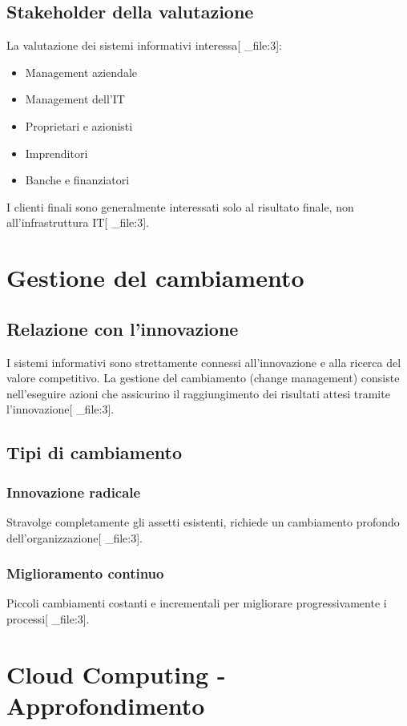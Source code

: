 \documentclass[12pt,a4paper]{article}
\begin{document}
\subsection{Stakeholder della valutazione}
La valutazione dei sistemi informativi interessa[ _file:3]:
\begin{itemize}
    \item Management aziendale
    \item Management dell'IT
    \item Proprietari e azionisti
    \item Imprenditori
    \item Banche e finanziatori
\end{itemize}

I clienti finali sono generalmente interessati solo al risultato finale, non all'infrastruttura IT[ _file:3].

\section{Gestione del cambiamento}

\subsection{Relazione con l'innovazione}
I sistemi informativi sono strettamente connessi all'innovazione e alla ricerca del valore competitivo. La gestione del cambiamento (change management) consiste nell'eseguire azioni che assicurino il raggiungimento dei risultati attesi tramite l'innovazione[ _file:3].

\subsection{Tipi di cambiamento}

\subsubsection{Innovazione radicale}
Stravolge completamente gli assetti esistenti, richiede un cambiamento profondo dell'organizzazione[ _file:3].

\subsubsection{Miglioramento continuo}
Piccoli cambiamenti costanti e incrementali per migliorare progressivamente i processi[ _file:3].

\section{Cloud Computing - Approfondimento}
\end{document}
